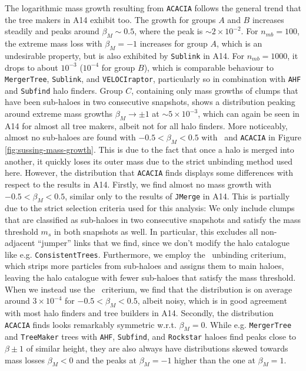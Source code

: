 The logarithmic mass growth resulting from \texttt{ACACIA} follows the general trend that the tree 
makers in A14 exhibit too. The growth for groups $A$ and $B$ increases steadily and peaks around 
$\beta_M \sim 0.5$, where the peak is $\sim2 \times 10^{-2}$. For $n_{mb} = 100$, the extreme mass 
loss  with $\beta_M = -1$ increases for group $A$, which is an undesirable property, but is also 
exhibited by \texttt{Sublink} in A14. For $n_{mb} = 1000$, it drops to about $10^{-3}$ ($10^{-4}$ 
for group $B$), which is comparable behaviour to \texttt{MergerTree}, \texttt{Sublink}, and 
\texttt{VELOCIraptor}, particularly so in combination with \texttt{AHF} and \texttt{Subfind} halo 
finders. Group $C$, containing only mass growths of clumps that have been sub-haloes in two 
consecutive snapshots, shows a distribution peaking around extreme mass growths $\beta_M 
\rightarrow \pm 1$ at $\sim 5 \times 10^{-3}$, which can again be seen in A14 for almost all tree 
makers, albeit not for all halo finders. More noticeably, almost no sub-haloes are found with $-0.5 
< \beta_M < 0.5$ with \phew\ and \texttt{ACACIA} in Figure \ref{fig:sussing-mass-growth}.
This is due to the fact that once a halo is merged into another, it quickly loses its 
outer mass due to the strict unbinding method used here. However, the distribution that 
\texttt{ACACIA} finds displays some differences with respect to the results in A14. Firstly,
we find almost no mass growth with $-0.5 < \beta_M < 0.5$, similar only to the results of 
\texttt{JMerge} in A14. This is partially due to the strict selection criteria used for this 
analysis: We only include clumps that are classified as sub-haloes in two consecutive snapshots and 
satisfy the mass threshold $m_s$ in both snapshots as well. In particular, this excludes all 
non-adjacent ``jumper'' links that we find, since we don't modify the halo catalogue like e.g. 
\texttt{ConsistentTrees}. Furthermore, we employ the \sad\ unbinding criterium, which strips more
particles from sub-haloes and assigns them to main haloes, leaving the halo catalogue with fewer 
sub-haloes that satisfy the mass threshold. When we instead use the \nosad\ 
criterium, we find that the distribution is on average around $3 \times 10^{-4}$ for $-0.5 < 
\beta_M < 0.5$, albeit noisy, which is in good agreement with most halo finders and tree builders 
in A14. 
Secondly, the distribution \texttt{ACACIA} finds looks remarkably symmetric w.r.t. $\beta_M = 0$.
While e.g. \texttt{MergerTree} and \texttt{TreeMaker} trees with \texttt{AHF}, \texttt{Subfind}, 
and \texttt{Rockstar} haloes find peaks close to $\beta \pm 1$ of similar height, they are also 
always have distributions skewed towards mass losses $\beta_M < 0$ and the peaks at $\beta_M = -1$ 
higher than the one at $\beta_M = 1$. 

